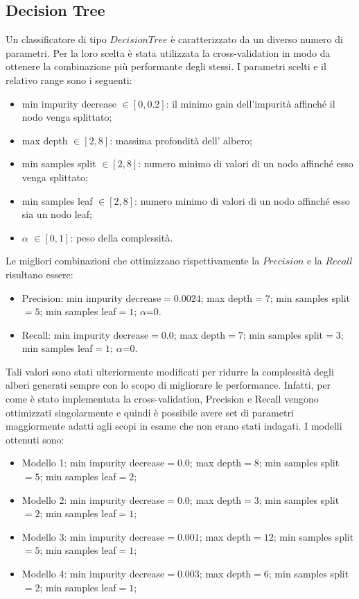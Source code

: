 \documentclass[a4paper,9pt]{article}
\begin{document}
\subsection{Decision Tree}
Un classificatore di tipo $Decision Tree$ è caratterizzato da un diverso numero di parametri. Per la loro scelta è stata utilizzata la cross-validation in modo da ottenere la combinazione più performante degli stessi. 
I parametri scelti e il relativo range sono i seguenti:

\begin{itemize}
\item min impurity decrease $ \in [0,0.2]$: il minimo gain dell'impurità affinché il nodo venga splittato;
\item max depth $ \in [2,8]$: massima profondità dell' albero;
\item min samples split $ \in [2,8]$: numero minimo di valori di un nodo affinché esso venga splittato;
\item min samples leaf $ \in [2,8]$: numero minimo di valori di un nodo affinché esso sia un  nodo leaf;
\item $\alpha$ $ \in [0,1]$: peso della complessità.
\end{itemize}

Le migliori combinazioni che ottimizzano rispettivamente la $Precision$ e la $Recall$ risultano essere:
\begin{itemize}
\item Precision: min impurity decrease$=0.0024$; max depth$=7$; min samples split$=5$; min samples leaf$=1$; $\alpha$=$0$.
\item Recall: min impurity decrease$=0.0$; max depth$=7$; min samples split$=3$; min samples leaf$=1$; $\alpha$=$0$.
\end{itemize}

Tali valori sono stati ulteriormente modificati per ridurre la complessità degli alberi generati sempre con lo scopo di migliorare le performance. Infatti, per come è stato implementata la cross-validation, Precision e Recall vengono ottimizzati singolarmente e quindi è possibile avere set di parametri maggiormente adatti agli scopi in esame che non erano stati indagati.
I modelli ottenuti sono:
\begin{itemize}
\item Modello 1: min impurity decrease$=0.0$; max depth$=8$; min samples split$=5$; min samples leaf$=2$; 
\item Modello 2: min impurity decrease$=0.0$; max depth$=3$; min samples split$=2$; min samples leaf$=1$; 
\item Modello 3: min impurity decrease$=0.001$; max depth$=12$; min samples split$=5$; min samples leaf$=1$; 
\item Modello 4: min impurity decrease$=0.003$; max depth$=6$; min samples split$=2$; min samples leaf$=1$; 
\end{itemize}
\end{document}
